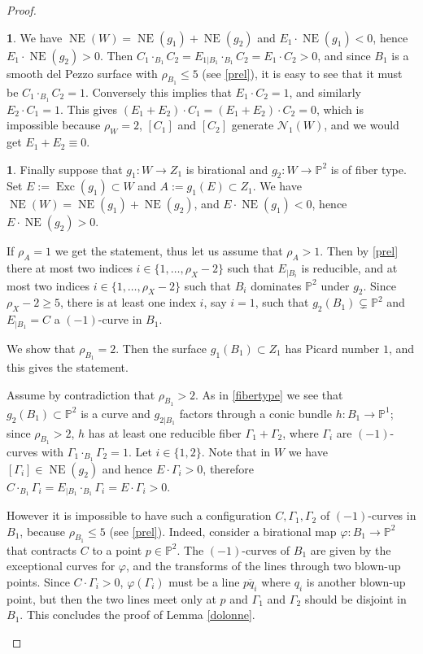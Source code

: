 \documentclass[a4paper,12pt]{amsart}
\theoremstyle{definition}
\newtheorem{prg}[thm]{}
\numberwithin{figure}{section}
\numberwithin{table}{section}
\newcommand{\ph}{\varphi}
\newcommand{\pr}{\mathbb{P}}
\newcommand{\N}{\mathcal{N}_1}
\newcommand{\NE}{\operatorname{NE}}
\newcommand{\Exc}{\operatorname{Exc}}
\begin{document}
\begin{proof}
\begin{prg}
We have $\NE(W)=\NE(g_1)+\NE(g_2)$ and $E_1\cdot \NE(g_1)<0$, hence $E_1\cdot \NE(g_2)>0$. Then $C_1\cdot_{B_1} C_2=E_{1|B_1}\cdot_{B_1} C_2=E_1\cdot C_2>0$, and since
$B_1$ is a smooth del Pezzo surface with $\rho_{B_1}\leq 5$ (see \ref{prel}), it is easy to see that it must be $C_1\cdot_{B_1} C_2=1$.
Conversely this implies that $E_1\cdot C_2=1$, and similarly 
$E_2\cdot C_1=1$. This gives $(E_1+E_2)\cdot C_1=(E_1+E_2)\cdot C_2=0$, which is impossible because $\rho_W=2$, $[C_1]$ and $[C_2]$ generate $\N(W)$, and we would get $E_1+E_2\equiv 0$.
\end{prg}
\begin{prg}
  Finally suppose that $g_1\colon W\to Z_1$ is birational and $g_2\colon W\to\pr^2$ is of fiber type.  Set $E:=\Exc(g_1)\subset W$ and $A:=g_1(E)\subset Z_1$. We have $\NE(W)=\NE(g_1)+\NE(g_2)$, and $E\cdot \NE(g_1)<0$, hence $E\cdot\NE(g_2)>0$.

  If $\rho_{A}=1$ we get the statement, thus let us assume that $\rho_A>1$. Then by \ref{prel} there at most two indices $i\in\{1,\dotsc,\rho_X-2\}$ such that $E_{|B_i}$ is reducible, and at  most two indices $i\in\{1,\dotsc,\rho_X-2\}$ such that $B_i$ dominates $\pr^2$ under $g_2$. Since $\rho_X-2\geq 5$, there is at least one index $i$, say $i=1$, such that $g_2(B_1)\subsetneq\pr^2$ and $E_{|B_1}=C$ a $(-1)$-curve in $B_1$.

  We show that $\rho_{B_1}=2$. Then the surface $g_1(B_1)\subset Z_1$ has Picard number $1$, and this gives the statement.

  Assume by contradiction that $\rho_{B_1}>2$.
As in \ref{fibertype} we see that $g_2(B_1)\subset\pr^2$ is a curve and 
$g_{2|B_1}$ factors through a conic bundle $h\colon B_1\to\pr^1$; since
$\rho_{B_1}>2$, $h$ 
 has at least one reducible fiber $\Gamma_1+\Gamma_2$, where $\Gamma_i$ are $(-1)$-curves with $\Gamma_1\cdot_{B_1}\Gamma_2=1$.
 Let $i\in\{1,2\}$. Note that in $W$ we have $[\Gamma_i]\in\NE(g_2)$ and hence $E\cdot \Gamma_i>0$, therefore  $C\cdot_{B_1}\Gamma_i=E_{|B_1}\cdot_{B_1}\Gamma_i=E\cdot\Gamma_i>0$.

  However it is impossible to have such a configuration $C,\Gamma_1,\Gamma_2$ of $(-1)$-curves in $B_1$, because $\rho_{B_1}\leq 5$ (see \ref{prel}). Indeed, consider a birational map $\ph\colon B_1\to\pr^2$ that contracts $C$ to a point $p\in\pr^2$. The $(-1)$-curves of $B_1$ are given by the exceptional curves for $\ph$, and the transforms of the lines through two blown-up points. 
  Since $C\cdot\Gamma_i>0$, $\ph(\Gamma_i)$ must be a line $\overline{pq_i}$
  where $q_i$  is another blown-up point, but then the two lines meet only at $p$ and $\Gamma_1$ and $\Gamma_2$ should be disjoint in $B_1$.
  This concludes the proof of Lemma \ref{dolonne}.\qedhere
\end{prg}
\end{proof}  
\end{document}
